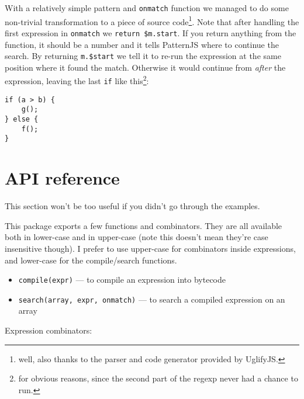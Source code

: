 \documentclass[a4paper,10pt]{article}
\begin{document}
With a relatively simple pattern and \texttt{onmatch} function we managed to do
some non-trivial transformation to a piece of source code\footnote{well, also thanks to the parser and code generator provided by
UglifyJS. }.  Note that
after handling the first expression in \texttt{onmatch} we \texttt{return \$m.start}.  If
you return anything from the function, it should be a number and it tells
PatternJS where to continue the search.  By returning \texttt{m.\$start} we tell it
to re-run the expression at the same position where it found the match.
Otherwise it would continue from \emph{after} the expression, leaving the last
\texttt{if} like this\footnote{for obvious reasons, since the second part of the regexp never had a
chance to run. }:


\begin{verbatim}
if (a > b) {
    g();
} else {
    f();
}
\end{verbatim}
\section{API reference}
\label{sec-4}


This section won't be too useful if you didn't go through the examples.

This package exports a few functions and combinators.  They are all
available both in lower-case and in upper-case (note this doesn't mean
they're case insensitive though).  I prefer to use upper-case for
combinators inside expressions, and lower-case for the compile/search
functions.

\begin{itemize}
\item \texttt{compile(expr)} — to compile an expression into bytecode
\item \texttt{search(array, expr, onmatch)} — to search a compiled expression on an array
\end{itemize}

Expression combinators:
\end{document}
